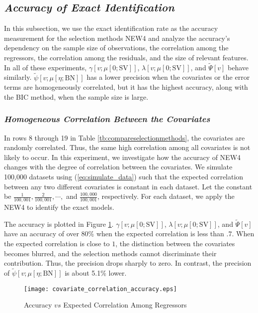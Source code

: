 \documentclass[a4paper,12pt]{article}
\begin{document}
\subsection{\textit{Accuracy of Exact Identification}}
\noindent
In this subsection, we use the exact identification rate as the accuracy measurement for the selection methods NEW4
and analyze the accuracy's dependency on the sample size of observations, the correlation among the regressors, the correlation among the residuals, and the size of relevant features.
In all of these experiments, $\gamma [v;\mu[0; \mathrm{SV}]]$, $\lambda [v;\mu[0; \mathrm{SV}]]$, and $\tilde \Psi [v]$ behave similarly. 
$\tilde \psi [v;\mu[\eta; \mathrm{BN}]]$ has a lower precision when the covariates or the error terms are homogeneously correlated, but it has the highest accuracy, along with the BIC method, when the sample size is large.


\subsubsection{\textit{Homogeneous Correlation Between the Covariates}}
\noindent
In rows 8 through 19 in Table \ref{tb:compareselectionmethods}, the covariates are randomly correlated. Thus, the same high correlation among all covariates is not likely to occur.
In this experiment, we investigate how the accuracy of NEW4 changes with the degree of correlation between the covariates.
We simulate 100,000 datasets using (\ref{eq:simulate_data}) such that the expected correlation between any two different covariates is constant in each dataset. 
Let the constant be $\frac{1}{100,001}, \frac{2}{100,001},\cdots,$ and $\frac{100,000}{100,001}$, respectively. For each dataset, we apply the NEW4 to identify the exact models. 

The accuracy is plotted in Figure \ref{fig:correlated_covariates}.
$\gamma [v;\mu[0; \mathrm{SV}]]$, $\lambda [v;\mu[0; \mathrm{SV}]]$, and  $\tilde \Psi [v]$ have an accuracy of over 80\% when the expected correlation is less than $.7$.
When the expected correlation is close to $1$, the distinction between the covariates becomes blurred, and the selection methods cannot discriminate their contribution. 
Thus, the precision drops sharply to zero.
In contrast,  the precision of $\tilde \psi [v;\mu[\eta; \mathrm{BN}]]$ is about 5.1\% lower.

\begin{figure}[!t]
	\centering
	\texttt{[image: covariate\_correlation\_accuracy.eps]}
	\caption{Accuracy $vs$ Expected Correlation Among Regressors}\label{fig:correlated_covariates}
\end{figure}
\end{document}
